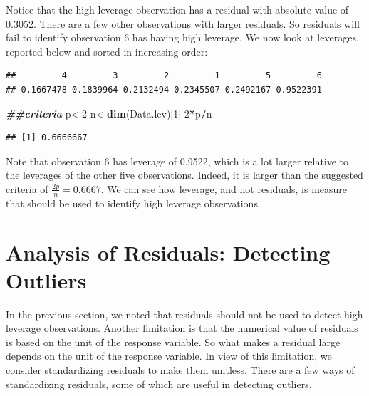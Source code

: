 \documentclass[
]{book}
\newenvironment{Shaded}{\begin{snugshade}}{\end{snugshade}}
\newcommand{\DecValTok}[1]{\textcolor[rgb]{0.00,0.00,0.81}{#1}}
\newcommand{\DocumentationTok}[1]{\textcolor[rgb]{0.56,0.35,0.01}{\textbf{\textit{#1}}}}
\newcommand{\FunctionTok}[1]{\textcolor[rgb]{0.13,0.29,0.53}{\textbf{#1}}}
\newcommand{\NormalTok}[1]{#1}
\newcommand{\OtherTok}[1]{\textcolor[rgb]{0.56,0.35,0.01}{#1}}
\newcommand{\SpecialCharTok}[1]{\textcolor[rgb]{0.81,0.36,0.00}{\textbf{#1}}}
\begin{document}
Notice that the high leverage observation has a residual with absolute value of 0.3052. There are a few other observations with larger residuals. So residuals will fail to identify observation 6 has having high leverage. We now look at leverages, reported below and sorted in increasing order:

\begin{Shaded}
\end{Shaded}

\begin{verbatim}
##         4         3         2         1         5         6 
## 0.1667478 0.1839964 0.2132494 0.2345507 0.2492167 0.9522391
\end{verbatim}

\begin{Shaded}
\begin{Highlighting}[]
\DocumentationTok{\#\#criteria}
\NormalTok{p}\OtherTok{\textless{}{-}}\DecValTok{2}
\NormalTok{n}\OtherTok{\textless{}{-}}\FunctionTok{dim}\NormalTok{(Data.lev)[}\DecValTok{1}\NormalTok{]}
\DecValTok{2}\SpecialCharTok{*}\NormalTok{p}\SpecialCharTok{/}\NormalTok{n}
\end{Highlighting}
\end{Shaded}

\begin{verbatim}
## [1] 0.6666667
\end{verbatim}

Note that observation 6 has leverage of 0.9522, which is a lot larger relative to the leverages of the other five observations. Indeed, it is larger than the suggested criteria of \(\frac{2p}{n} = 0.6667\). We can see how leverage, and not residuals, is measure that should be used to identify high leverage observations.

\hypertarget{analysis-of-residuals-detecting-outliers}{%
\section{Analysis of Residuals: Detecting Outliers}\label{analysis-of-residuals-detecting-outliers}}

In the previous section, we noted that residuals should not be used to detect high leverage observations. Another limitation is that the numerical value of residuals is based on the unit of the response variable. So what makes a residual large depends on the unit of the response variable. In view of this limitation, we consider standardizing residuals to make them unitless. There are a few ways of standardizing residuals, some of which are useful in detecting outliers.
\end{document}
